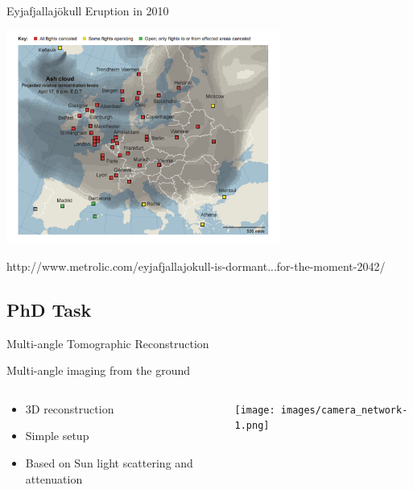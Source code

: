 \documentclass[compress,red,12pt]{beamer}
\begin{document}
\begin{frame}[label=current]{Eyjafjallaj\"{o}kull Eruption in 2010}
  \begin{center}
    \includegraphics[height=7cm]{images/volcano-airport.jpg}
  \end{center}
  \begin{flushright}
    {\tiny http://www.metrolic.com/eyjafjallajokull-is-dormant...for-the-moment-2042/}
  \end{flushright}
\end{frame}


\subsection{PhD Task}

\begin{frame}{Multi-angle Tomographic Reconstruction}
  \begin{center}
    {
      \centerline{\def\svgwidth{\linewidth}\small{}}
    }
    {
      \centerline{\def\svgwidth{\linewidth}\small{}}
    }
  \end{center}
\end{frame}


\begin{frame}{Multi-angle imaging from the ground}
  \begin{columns}[T]
    \begin{column}{.5\textwidth}
      \begin{itemize}
      \item 3D reconstruction
      \item Simple setup
      \item Based on Sun light scattering and attenuation
      \end{itemize}
    \end{column}
    \begin{column}{.5\textwidth}
      \centering
      {\texttt{[image: images/camera\_network-1.png]}}
    \end{column}
  \end{columns}
\end{frame}
\end{document}
